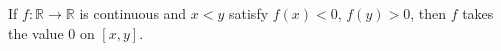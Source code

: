 If $f\colon \mathbb{R}\to \mathbb{R}$ is continuous and $x < y$ satisfy
$f(x) < 0$, $f(y) > 0$, then $f$ takes the value $0$ on $[x, y]$.
